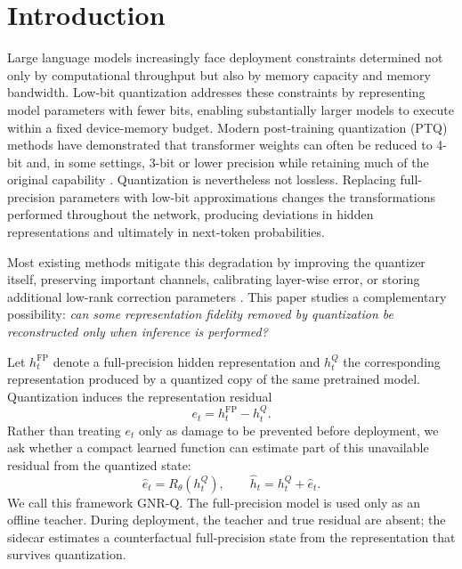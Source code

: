 \documentclass[11pt]{article}
\newcommand{\gnrq}{GNR-Q}
\newcommand{\hfp}{h^{\mathrm{FP}}}
\newcommand{\hq}{h^{Q}}
\begin{document}
\section{Introduction}

Large language models increasingly face deployment constraints determined not only by computational throughput but also by memory capacity and memory bandwidth. Low-bit quantization addresses these constraints by representing model parameters with fewer bits, enabling substantially larger models to execute within a fixed device-memory budget. Modern post-training quantization (PTQ) methods have demonstrated that transformer weights can often be reduced to 4-bit and, in some settings, 3-bit or lower precision while retaining much of the original capability \cite{frantar2022gptq,lin2024awq}. Quantization is nevertheless not lossless. Replacing full-precision parameters with low-bit approximations changes the transformations performed throughout the network, producing deviations in hidden representations and ultimately in next-token probabilities.

Most existing methods mitigate this degradation by improving the quantizer itself, preserving important channels, calibrating layer-wise error, or storing additional low-rank correction parameters \cite{zhang2024lqer,zhang2025qera,zhao2025aser,arai2025qep}. This paper studies a complementary possibility: \emph{can some representation fidelity removed by quantization be reconstructed only when inference is performed?}

Let $\hfp_t$ denote a full-precision hidden representation and $\hq_t$ the corresponding representation produced by a quantized copy of the same pretrained model. Quantization induces the representation residual
\begin{equation}
 e_t = \hfp_t - \hq_t.
\end{equation}
Rather than treating $e_t$ only as damage to be prevented before deployment, we ask whether a compact learned function can estimate part of this unavailable residual from the quantized state:
\begin{equation}
 \hat e_t = R_\theta(\hq_t),
 \qquad
 \hat h_t = \hq_t + \hat e_t.
\end{equation}
We call this framework \gnrq{}. The full-precision model is used only as an offline teacher. During deployment, the teacher and true residual are absent; the sidecar estimates a counterfactual full-precision state from the representation that survives quantization.
\end{document}
